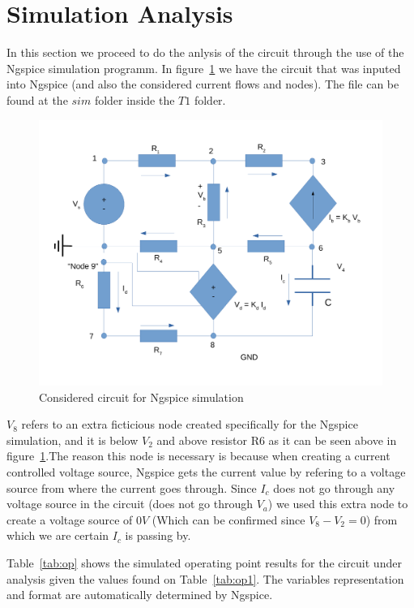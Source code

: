 \newpage
\section{Simulation Analysis}
\label{sec:simulation}

In this section we proceed to do the anlysis of the circuit through the use of the Ngspice simulation programm. In figure~\ref{fig:circuit_simulation} we have the circuit that was inputed into Ngspice (and also the considered current flows and nodes). The file can be found at the $sim$ folder inside the $T1$ folder.

\begin{figure}[!ht] \centering
\includegraphics[width=0.8\linewidth]{circuit_simulation.pdf}
\caption{Considered circuit for Ngspice simulation}
\label{fig:circuit_simulation}
\end{figure}

$V_8$ refers to an extra ficticious node created specifically for the Ngspice simulation, and it is below $V_2$ and above resistor R6 as it can be seen above in figure~\ref{fig:circuit_simulation}.The reason this node is necessary is because when creating a current controlled voltage source, Ngspice gets the current value by refering to a voltage source from where the current goes through. Since $I_c$ does not go through any voltage source in the circuit (does not go through $V_a$) we used this extra node to create a voltage source of 0$V$ (Which can be confirmed since $V_8 - V_2 = 0$) from which we are certain $I_c$ is passing by. 

Table~\ref{tab:op} shows the simulated operating point results for the circuit
under analysis given the values found on Table~\ref{tab:op1}. The variables representation and format are automatically determined by Ngspice.

